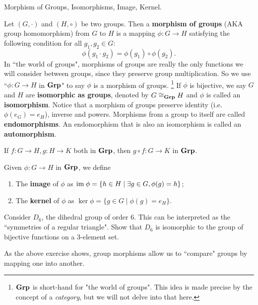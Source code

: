 \documentclass[../../book.tex]{subfiles}
\begin{document}
\begin{dfn} Morphism of Groups, Isomorphisms, Image, Kernel. 

Let $(G,\cdot)$ and $(H,\circ)$ be two groups. 
Then a \textbf{morphism of groups} (AKA group homomorphism) from $G$ to $H$ is a mapping $\phi : G \to H$ 
satisfying the following condition for all $g_1, g_2 \in G$:
\[\phi(g_1 \cdot g_2)=\phi(g_1) \circ \phi(g_2).\]
In ``the world of groups", 
morphisms of groups are really the only functions we will consider between groups,
since they preserve group multiplication. 
So we use ``$\phi : G \to H$ in $\mathbf{Grp}$" to say $\phi$ is a morphism of groups. 
\footnote{$\mathbf{Grp}$ is short-hand for "the world of groups".
    This idea is made precise by the concept of a \emph{category},
    but we will not delve into that here. 
}
If $\phi$ is bijective, we say $G$ and $H$ are \textbf{isomorphic as groups}, 
denoted by $G \cong_{\mathbf{Grp}} H$ and $\phi$ is called an \textbf{isomorphism}. 
Notice that a morphism of groups preserve identity (i.e. $\phi(e_G)=e_H$), 
inverse and powers.
Morphisms from a group to itself are called \textbf{endomorphisms}.
An endomorphism that is also an isomorphism is called an \textbf{automorphism}.

If $f:G \to H, g: H \to K$ both in $\mathbf{Grp}$, then $g \circ f: G \to K$ in $\mathbf{Grp}$. 

Given $\phi: G \to H$ in $\mathbf{Grp}$, we define
\begin{enumerate}
    \item The \textbf{image} of $\phi$ as 
        $\textnormal{im}\; \phi=\{h \in H \mid \exists g \in G, \phi(g)=h\}$;
    \item The \textbf{kernel} of $\phi$ as 
        $\ker \phi=\{g \in G \mid \phi(g)=e_H\}$.
\end{enumerate}
\end{dfn}
\begin{ex} 
    
    Consider $D_6$, the dihedral group of order $6$. 
    This can be interpreted as the ``symmetries of a regular triangle".
    Show that $D_6$ is isomorphic to 
    the group of bijective functions on a 3-element set. 
    
\end{ex}
\begin{rmk}
    
    As the above exercise shows, 
    group morphisms allow us to ``compare" groups by mapping one into another.
\end{rmk}
\end{document}
